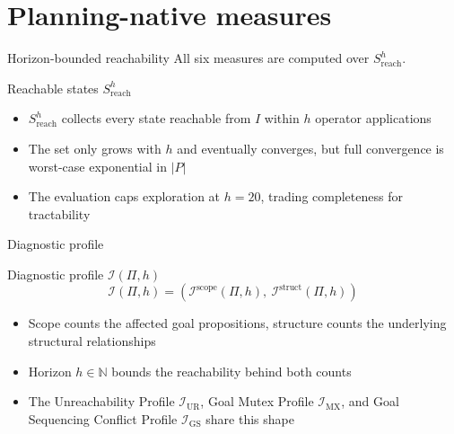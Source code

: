 \section{Planning-native measures}

\begin{frame}{Horizon-bounded reachability}
    All six measures are computed over $S^h_{\text{reach}}$.

    \begin{block}{Reachable states $S^h_{\text{reach}}$}
        \begin{itemize}
            \item $S^h_{\text{reach}}$ collects every state reachable from $I$ within $h$ operator applications
            \item The set only grows with $h$ and eventually converges, but full convergence is worst-case exponential in $|P|$
            \item The evaluation caps exploration at $h = 20$, trading completeness for tractability
        \end{itemize}
    \end{block}

\end{frame}

\begin{frame}{Diagnostic profile}
    \begin{block}{Diagnostic profile $\mathcal{I}(\Pi, h)$}
        \[
            \mathcal{I}(\Pi, h) = (\mathcal{I}^{\text{scope}}(\Pi, h),\ \mathcal{I}^{\text{struct}}(\Pi, h))
        \]
        \begin{itemize}
            \item Scope counts the affected goal propositions, structure counts the underlying structural relationships
            \item Horizon $h \in \mathbb{N}$ bounds the reachability behind both counts
            \item The Unreachability Profile $\mathcal{I}_{\text{UR}}$, Goal Mutex Profile $\mathcal{I}_{\text{MX}}$, and Goal Sequencing Conflict Profile $\mathcal{I}_{\text{GS}}$ share this shape
        \end{itemize}
    \end{block}

\end{frame}

